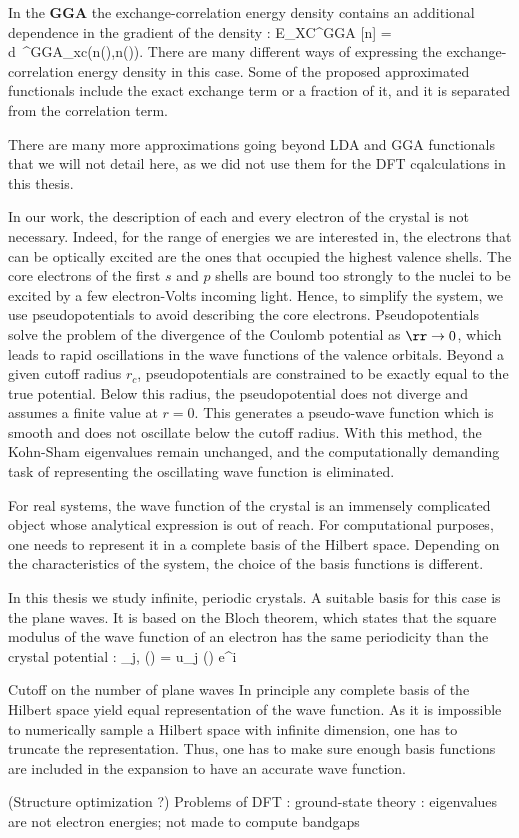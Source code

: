 In the \textbf{\gls{GGA}} the exchange-correlation energy density contains an additional dependence in the gradient of the density :
\be
 	E_{XC}^{GGA} [n] = \int d\rr \ \epsilon^{GGA}_{xc}(n(\rr),\nabla n(\rr)).
\ee
There are many different ways of expressing the exchange-correlation energy density in this case. Some of the proposed approximated functionals include the exact exchange term or a fraction of it, and it is separated from the correlation term.

There are many more approximations going beyond LDA and GGA functionals that we will not detail here, as we did not use them for the DFT cqalculations in this thesis.\newline

In our work, the description of each and every electron of the crystal is not necessary. Indeed, for the range of energies we are interested in, the electrons that can be optically excited are the ones that occupied the highest valence shells. The core electrons of the first $s$ and $p$ shells are bound too strongly to the nuclei to be excited by a few electron-Volts incoming light. Hence, to simplify the system, we use pseudopotentials to avoid describing the core electrons.
Pseudopotentials solve the problem of the divergence of the Coulomb potential as $\rr  \to 0$, which leads to rapid oscillations in the wave functions of the valence orbitals.
Beyond a given cutoff radius $r_c$, pseudopotentials are constrained to be exactly equal to the true
potential. Below this radius, the pseudopotential does not diverge and assumes a finite value at $r=0$. This generates a pseudo-wave function which is smooth and does not oscillate below the cutoff radius. With this method, the Kohn-Sham eigenvalues remain unchanged, and the computationally demanding task of representing the oscillating wave function is eliminated.\newline

For real systems, the wave function of the crystal is an immensely complicated object whose analytical expression is out of reach. For computational purposes, one needs to represent it in a complete basis of the Hilbert space. Depending on the characteristics of the system, the choice of the basis functions is different.

In this thesis we study infinite, periodic crystals. A suitable basis for this case is the plane waves. It is based on the Bloch theorem, which states that the square modulus of the wave function of an electron has the same periodicity than the crystal potential :
\be
 	\phi_{j,\kk} (\rr) = u_j (\rr) e^{i\kk\cdot\rr}
\ee



Cutoff on the number of plane waves
In principle any complete basis of the Hilbert space yield equal representation of the wave function. As it is impossible to numerically sample a Hilbert space with infinite dimension, one has to truncate the representation. Thus, one has to make sure enough basis functions are included in the expansion to have an accurate wave function.

(Structure optimization ?)
Problems of DFT : ground-state theory : eigenvalues are not electron energies; not made to compute bandgaps
